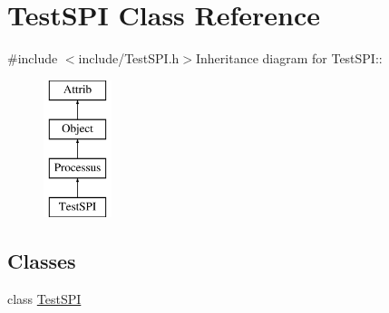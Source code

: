 \hypertarget{classTestSPI}{
\section{TestSPI Class Reference}
\label{classTestSPI}
}


{\ttfamily \#include $<$include/TestSPI.h$>$}Inheritance diagram for TestSPI::\begin{figure}[H]
\begin{center}
\leavevmode
\includegraphics[height=4cm]{classTestSPI}
\end{center}
\end{figure}
\subsection*{Classes}
\begin{DoxyCompactItemize}
\item 
class \hyperlink{classTestSPI_1_1TestSPI}{TestSPI}
\end{DoxyCompactItemize}
